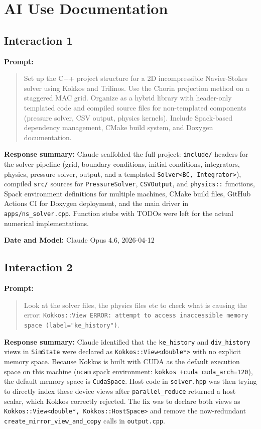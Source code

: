 
\section*{AI Use Documentation}

\subsection*{Interaction 1}

\textbf{Prompt:}
\begin{quote}
Set up the C++ project structure for a 2D incompressible Navier-Stokes solver using Kokkos and Trilinos. Use the Chorin projection method on a staggered MAC grid. Organize as a hybrid library with header-only templated code and compiled source files for non-templated components (pressure solver, CSV output, physics kernels). Include Spack-based dependency management, CMake build system, and Doxygen documentation.
\end{quote}

\textbf{Response summary:}
Claude scaffolded the full project: \texttt{include/} headers for the solver pipeline (grid, boundary conditions, initial conditions, integrators, physics, pressure solver, output, and a templated \texttt{Solver<BC, Integrator>}), compiled \texttt{src/} sources for \texttt{PressureSolver}, \texttt{CSVOutput}, and \texttt{physics::} functions, Spack environment definitions for multiple machines, CMake build files, GitHub Actions CI for Doxygen deployment, and the main driver in \texttt{apps/ns\_solver.cpp}. Function stubs with TODOs were left for the actual numerical implementations.

\textbf{Date and Model:} Claude Opus 4.6, 2026-04-12

\subsection*{Interaction 2}

\textbf{Prompt:}
\begin{quote}
Look at the solver files, the physics files etc to check what is causing the error:
\texttt{Kokkos::View ERROR: attempt to access inaccessible memory space (label="ke\_history")}.
\end{quote}

\textbf{Response summary:}
Claude identified that the \texttt{ke\_history} and \texttt{div\_history} views in \texttt{SimState} were declared as \texttt{Kokkos::View<double*>} with no explicit memory space. Because Kokkos is built with CUDA as the default execution space on this machine (\texttt{ncam} spack environment: \texttt{kokkos +cuda cuda\_arch=120}), the default memory space is \texttt{CudaSpace}. Host code in \texttt{solver.hpp} was then trying to directly index these device views after \texttt{parallel\_reduce} returned a host scalar, which Kokkos correctly rejected. The fix was to declare both views as \texttt{Kokkos::View<double*, Kokkos::HostSpace>} and remove the now-redundant \texttt{create\_mirror\_view\_and\_copy} calls in \texttt{output.cpp}.

